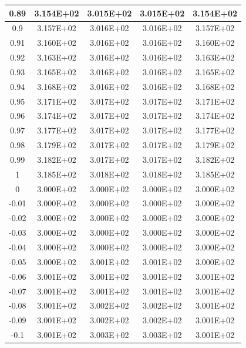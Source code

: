 \documentclass{article}
\begin{document}
\begin{center}
\begin{longtable}{|c|c|c|c|c|}
            0.89 & 3.154E+02 & 3.015E+02 & 3.015E+02 & 3.154E+02 \\ \hline
            0.9 & 3.157E+02 & 3.016E+02 & 3.016E+02 & 3.157E+02 \\ \hline
            0.91 & 3.160E+02 & 3.016E+02 & 3.016E+02 & 3.160E+02 \\ \hline
            0.92 & 3.163E+02 & 3.016E+02 & 3.016E+02 & 3.163E+02 \\ \hline
            0.93 & 3.165E+02 & 3.016E+02 & 3.016E+02 & 3.165E+02 \\ \hline
            0.94 & 3.168E+02 & 3.016E+02 & 3.016E+02 & 3.168E+02 \\ \hline
            0.95 & 3.171E+02 & 3.017E+02 & 3.017E+02 & 3.171E+02 \\ \hline
            0.96 & 3.174E+02 & 3.017E+02 & 3.017E+02 & 3.174E+02 \\ \hline
            0.97 & 3.177E+02 & 3.017E+02 & 3.017E+02 & 3.177E+02 \\ \hline
            0.98 & 3.179E+02 & 3.017E+02 & 3.017E+02 & 3.179E+02 \\ \hline
            0.99 & 3.182E+02 & 3.017E+02 & 3.017E+02 & 3.182E+02 \\ \hline
            1 & 3.185E+02 & 3.018E+02 & 3.018E+02 & 3.185E+02 \\ \hline
            0 & 3.000E+02 & 3.000E+02 & 3.000E+02 & 3.000E+02 \\ \hline
            -0.01 & 3.000E+02 & 3.000E+02 & 3.000E+02 & 3.000E+02 \\ \hline
            -0.02 & 3.000E+02 & 3.000E+02 & 3.000E+02 & 3.000E+02 \\ \hline
            -0.03 & 3.000E+02 & 3.000E+02 & 3.000E+02 & 3.000E+02 \\ \hline
            -0.04 & 3.000E+02 & 3.000E+02 & 3.000E+02 & 3.000E+02 \\ \hline
            -0.05 & 3.000E+02 & 3.001E+02 & 3.001E+02 & 3.000E+02 \\ \hline
            -0.06 & 3.001E+02 & 3.001E+02 & 3.001E+02 & 3.001E+02 \\ \hline
            -0.07 & 3.001E+02 & 3.001E+02 & 3.001E+02 & 3.001E+02 \\ \hline
            -0.08 & 3.001E+02 & 3.002E+02 & 3.002E+02 & 3.001E+02 \\ \hline
            -0.09 & 3.001E+02 & 3.002E+02 & 3.002E+02 & 3.001E+02 \\ \hline
            -0.1 & 3.001E+02 & 3.003E+02 & 3.003E+02 & 3.001E+02 \\ \hline

\end{longtable}
\end{center}
\end{document}
